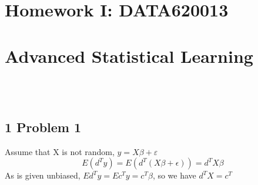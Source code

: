 \documentclass[10pt,a4paper]{article}
\begin{document}

{\centering\section*{Homework I: DATA620013}}
{\centering\section*{Advanced Statistical Learning}}
%
\begin{flushright}
	\Large {} \\
	\Large {} \\
\end{flushright}


\subsection{1 Problem 1}
Assume that X is not random, $y=X\beta + \varepsilon$\\
$$ E(d^Ty)=E(d^T(X\beta+\epsilon))=d^TX\beta $$ 
As is given unbiased, $Ed^Ty=Ec^Ty=c^T\beta$, so we have $d^TX=c^T$
\end{document}
